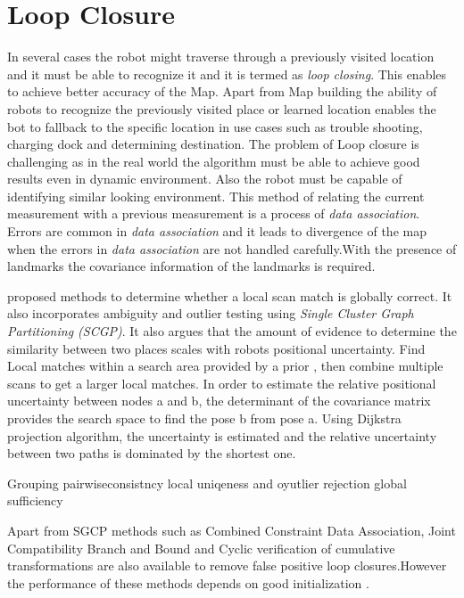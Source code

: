 \section{Loop Closure}
In several cases the robot might traverse through a previously visited location and it must be able to recognize it and it is termed as \textit{loop closing}. This enables to achieve better accuracy of the Map. Apart from Map building the ability of robots to recognize the previously visited place or learned location enables the bot to fallback to the specific location in use cases such as trouble shooting, charging dock and determining destination. The problem of Loop closure is challenging as in the real world the algorithm must be able to achieve good results even in dynamic environment. Also the robot must be capable of identifying similar looking environment. This method of relating the current measurement with a previous measurement is a process of \textit{data association}. Errors are common in \textit{data association} and it leads to divergence of the map when the errors in \textit{data association} are not handled carefully.With the presence of landmarks the covariance information of the landmarks is required.
\par
\cite{E.Olson/LocalSM} proposed methods to determine whether a local scan match is globally correct. It also incorporates ambiguity and outlier testing using \textit{Single Cluster Graph Partitioning (SCGP)}. It also argues that the amount of evidence to determine the similarity between two places scales with robots positional uncertainty. Find Local matches within a search area provided by a prior , then combine multiple scans to get a larger local matches. In order to estimate the relative positional uncertainty between nodes a and b, the determinant of the covariance matrix provides the search space to find the pose b from pose a. Using Dijkstra projection algorithm, the uncertainty is estimated and the relative uncertainty between two paths is dominated by the shortest one. 

Grouping
pairwiseconsistncy
local uniqeness and oyutlier rejection
global sufficiency

Apart from SGCP methods such as Combined Constraint Data Association, Joint Compatibility Branch and Bound and Cyclic verification of cumulative transformations are also available
to remove false positive loop closures.However the performance of these methods depends on good initialization \cite{P.Agarwal}.
